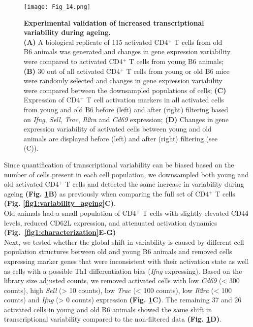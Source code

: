 \begin{figure}[!ht]
\centering
\texttt{[image: Fig\_14.png]}
\caption[Experimental validation of increased transcriptional variability during ageing]{\textbf{Experimental validation of increased transcriptional variability during ageing.} \\
\textbf{(A)} A biological replicate of 115 activated CD4$^+$ T cells from old B6 animals was generated and changes in gene expression variability were compared to activated CD4$^+$ T cells from young B6 animals; \textbf{(B)} 30 out of all activated CD4$^+$ T cells from young or old B6 mice were randomly selected and changes in gene expression variability were compared between the downsampled populations of cells; \textbf{(C)} Expression of CD4$^+$ T cell activation markers in all activated cells from young and old B6 before (left) and after (right) filtering based on \textit{Ifng}, \textit{Sell}, \textit{Trac}, \textit{Il2ra} and \textit{Cd69} expression; \textbf{(D)} Changes in gene expression variability of activated cells between young and old animals are displayed before (left) and after (right) filtering (see (C)).}
\label{fig1:validation}
\end{figure}

Since quantification of transcriptional variability can be biased based on the number of cells present in each cell population, we downsampled both young and old activated CD4$^+$ T cells and detected the same increase in variability during ageing \textbf{(Fig. \ref{fig1:validation}B)} as previously when comparing the full set of CD4$^+$ T cells \textbf{(Fig. \ref{fig1:variability_ageing}C)}. \\

Old animals had a small population of CD4$^+$ T cells with slightly elevated CD44 levels, reduced CD62L expression, and attenuated activation dynamics \textbf{(Fig.~\ref{fig1:characterization}E-G)}\\

Next, we tested whether the global shift in variability is caused by different cell population structures between old and young B6 animals and removed cells expressing marker genes that were inconsistent with their activation state as well as cells with a possible Th1 differentiation bias (\textit{Ifng} expressing). Based on the library size adjusted counts, we removed activated cells with low \textit{Cd69} (< 300 counts), high \textit{Sell} (> 10 counts), low \textit{Trac} (< 100 counts), low \textit{Il2ra} (< 100 counts) and \textit{Ifng} (> 0 counts) expression \textbf{(Fig. \ref{fig1:validation}C)}. The remaining 37 and 26 activated cells in young and old B6 animals showed the same shift in transcriptional variability compared to the non-filtered data \textbf{(Fig. \ref{fig1:validation}D)}. \\

